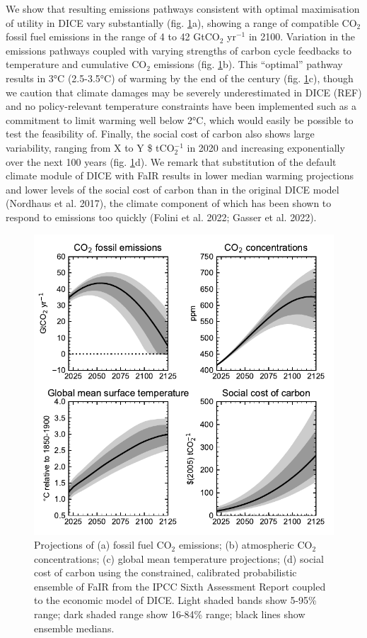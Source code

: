 \documentclass{article}
\begin{document}
We show that resulting emissions pathways consistent with optimal maximisation of utility in DICE vary substantially (fig. \ref{fig:projections}a), showing a range of compatible CO$_2$ fossil fuel emissions in the range of 4 to 42 GtCO$_2$ yr$^{-1}$ in 2100. Variation in the emissions pathways coupled with varying strengths of carbon cycle feedbacks to temperature and cumulative CO$_2$ emissions (fig. \ref{fig:projections}b). This ``optimal'' pathway results in 3°C (2.5-3.5°C) of warming by the end of the century (fig. \ref{fig:projections}c), though we caution that climate damages may be severely underestimated in DICE (REF) and no policy-relevant temperature constraints have been implemented such as a commitment to limit warming well below 2°C, which would easily be possible to test the feasibility of. Finally, the social cost of carbon also shows large variability, ranging from X to Y \$ tCO$_2^{-1}$ in 2020 and increasing exponentially over the next 100 years (fig. \ref{fig:projections}d). We remark that substitution of the default climate module of DICE with FaIR results in lower median warming projections and lower levels of the social cost of carbon than in the original DICE model (Nordhaus et al. 2017), the climate component of which has been shown to respond to emissions too quickly (Folini et al. 2022; Gasser et al. 2022).

\begin{figure}
\centering
\includegraphics[width=12cm]{../../figures/climate_projections.pdf}
\caption{Projections of (a) fossil fuel CO$_2$ emissions; (b) atmospheric CO$_2$ concentrations; (c) global mean temperature projections; (d) social cost of carbon using the constrained, calibrated probabilistic ensemble of FaIR from the IPCC Sixth Assessment Report coupled to the economic model of DICE. Light shaded bands show 5-95\% range; dark shaded range show 16-84\% range; black lines show ensemble medians.}
\label{fig:projections}
\end{figure}
\end{document}
